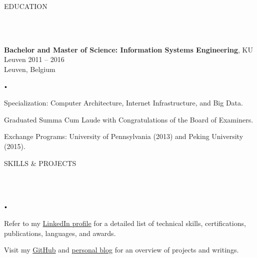 \documentclass{article}
\newcommand{\header}[1]{
    {
        \hspace*{-4pt}
        \vspace*{8pt}
        \uppercase{#1}
    }
    \vspace*{-4pt} 
    \lineunder
    \vspace*{8pt}
}
\newcommand{\lineunder}{
    \vspace*{-8pt} \\ 
    \hspace*{-4pt} 
    \hrulefill \\
}
\newcommand{\experience}[5]{
    \vspace*{2pt}
    \textbf{#1}, #2 \hfill #3 \\ 
    #4 \\
    #5
    \vspace*{2pt}
}
\newcommand{\spacedbullet}{
    $\vcenter{\hbox{\tiny$\bullet$}}$\hspace*{-2pt}
}
\newenvironment{bulletlist}{
    \begin{list}
        {\spacedbullet}{\setlength\leftmargin{10pt} 
        \topsep 0pt \itemsep -2pt}}{\vspace*{4pt}
    \end{list}
}
\begin{document}
\vspace*{4pt}

\header{Education}
\experience{Bachelor and Master of Science: Information Systems Engineering}{KU Leuven}{2011 -- 2016}{Leuven, Belgium}
{
    \begin{bulletlist}
        \item Specialization: Computer Architecture, Internet Infrastructure, and Big Data.
        \item Graduated Summa Cum Laude with Congratulations of the Board of Examiners.
        \item Exchange Programs: University of Pennsylvania (2013) and Peking University (2015).
    \end{bulletlist}
}

\vspace*{4pt}
\header{Skills \& Projects}
\begin{bulletlist}
    \item Refer to my \href{https://linkedin.com/in/nielsdegrande/}{LinkedIn profile} for a detailed list of technical skills, certifications, publications, languages, and awards.
    \item Visit my \href{https://github.com/NielsDegrande/}{GitHub} and \href{https://niels.degran.de/blog}{personal blog} for an overview of projects and writings.
\end{bulletlist}
\end{document}
